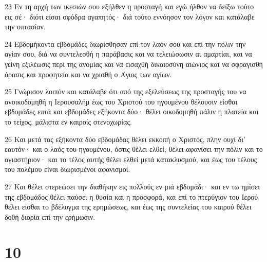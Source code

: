 \par 23 Εν τη αρχή των ικεσιών σου εξήλθεν η προσταγή και εγώ ήλθον να δείξω τούτο εις σέ· διότι είσαι σφόδρα αγαπητός· διά τούτο εννόησον τον λόγον και κατάλαβε την οπτασίαν.
\par 24 Εβδομήκοντα εβδομάδες διωρίσθησαν επί τον λαόν σου και επί την πόλιν την αγίαν σου, διά να συντελεσθή η παράβασις και να τελειώσωσιν αι αμαρτίαι, και να γείνη εξιλέωσις περί της ανομίας και να εισαχθή δικαιοσύνη αιώνιος και να σφραγισθή όρασις και προφητεία και να χρισθή ο Άγιος των αγίων.
\par 25 Γνώρισον λοιπόν και κατάλαβε ότι από της εξελεύσεως της προσταγής του να ανοικοδομηθή η Ιερουσαλήμ έως του Χριστού του ηγουμένου θέλουσιν είσθαι εβδομάδες επτά και εβδομάδες εξήκοντα δύο· θέλει οικοδομηθή πάλιν η πλατεία και το τείχος, μάλιστα εν καιροίς στενοχωρίας.
\par 26 Και μετά τας εξήκοντα δύο εβδομάδας θέλει εκκοπή ο Χριστός, πλην ουχί δι' εαυτόν· και ο λαός του ηγουμένου, όστις θέλει ελθεί, θέλει αφανίσει την πόλιν και το αγιαστήριον· και το τέλος αυτής θέλει ελθεί μετά κατακλυσμού, και έως του τέλους του πολέμου είναι διωρισμένοι αφανισμοί.
\par 27 Και θέλει στερεώσει την διαθήκην εις πολλούς εν μιά εβδομάδι· και εν τω ημίσει της εβδομάδος θέλει παύσει η θυσία και η προσφορά, και επί το πτερύγιον του Ιερού θέλει είσθαι το βδέλυγμα της ερημώσεως, και έως της συντελείας του καιρού θέλει δοθή διορία επί την ερήμωσιν.

\chapter{10}

